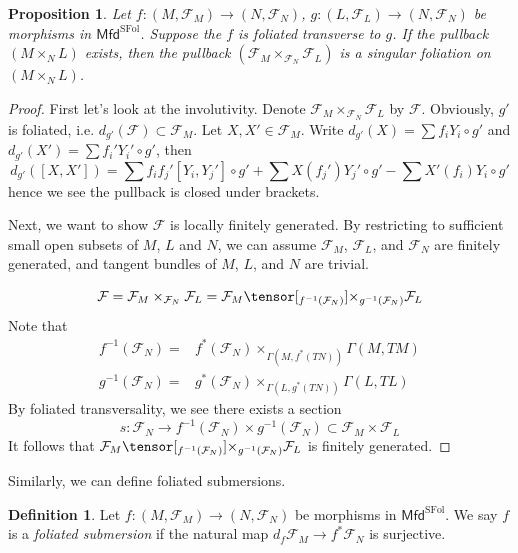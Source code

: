 \documentclass[12pt]{amsart}
\newtheorem{prop}[thm]{Proposition}
\theoremstyle{definition}
\newtheorem{defn}[thm]{Definition}
\theoremstyle{remark}
\numberwithin{equation}{section}
\newcommand{\CF}{{\mathcal F}}
\newcommand{\1}{{\mathbb{1}}}
\newcommand{\mfd}{\mathsf{Mfd}}
\newcommand{\sfol}{{\operatorname{SFol}}}
\begin{document}
\begin{prop}
Let $f:(M, \CF_M)
    \to (N, \CF_N)$, $g: (L, \CF_L) \to (N, \CF_N)$ be morphisms in $ \mfd^{\sfol}$. Suppose the $f$ is foliated transverse to $g$. If the pullback $(M\times_N L)$ exists, then the pullback $(\CF_M\times_{\CF_N} \CF_L)$ is a singular foliation on $(M\times_N L)$.
    \begin{center}
\end{center}
\end{prop}
\begin{proof}
    First let's look at the involutivity. Denote $\CF_M\times_{\CF_N} \CF_L$ by $\CF$.  Obviously, $g'$ is foliated, i.e. $d_{g'}(\CF) \subset \CF_M$. Let $X, X' \in \CF_M$. Write $d_{g'}(X) = \sum f_i Y_i\circ g'$ and $d_{g'}(X') = \sum f_i' Y_i'\circ g'$, then
    \begin{equation*}
        d_{g'}([X, X']) = \sum f_if_j' [Y_i, Y_j']\circ g' + \sum X(f_j')Y_j' \circ g' - \sum X'(f_i)Y_i \circ g'
    \end{equation*}
    hence we see the pullback is closed under brackets.
    
    Next, we want to show $\CF$ is locally finitely generated. By restricting to sufficient small open subsets of $M$, $L$ and $N$, we can assume $\CF_M$, $\CF_L$, and $\CF_N$ are finitely generated, and tangent bundles of $M$, $L$, and $N$ are trivial.
    
    \begin{equation*}
        \CF = \CF_M\times_{\CF_N} \CF_L
        =\CF_M \tensor[_{f^{-1}(\CF_N)}]{\times}{_{g^{-1}(\CF_N)}}  \CF_L
    \end{equation*}
    Note that \begin{align*}
        f^{-1}(\CF_N) =& f^*(\CF_N)\times_{\Gamma(M, f^*(TN))} \Gamma(M, TM)\\
        g^{-1}(\CF_N) =& g^*(\CF_N)\times_{\Gamma(L, g^*(TN))} \Gamma(L, TL)
    \end{align*}
    By foliated transversality, we see there exists a section
    $$
    s: \CF_N \to f^{-1}(\CF_N) \times g^{-1}(\CF_N)\subset \CF_M \times \CF_L
    $$
    It follows that $\CF_M \tensor[_{f^{-1}(\CF_N)}]{\times}{_{g^{-1}(\CF_N)}}  \CF_L$ is finitely generated.
\end{proof}
Similarly, we can define foliated submersions.
\begin{defn}
    Let $f:(M, \CF_M)
    \to (N, \CF_N)$ be morphisms in $ \mfd^{\sfol}$. We say $f$ is a {\it foliated submersion} if the natural map $d_f \CF_M \to f^*\CF_N$ is surjective.
\end{defn}
\end{document}
